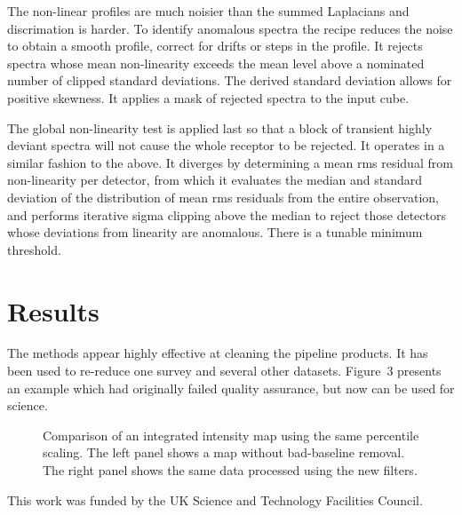 \documentclass[11pt,twoside]{article}
\begin{document}
The non-linear profiles are much noisier than the summed Laplacians
and discrimation is harder.  To identify anomalous spectra the recipe
reduces the noise to obtain a smooth profile, correct for drifts or
steps in the profile.  It rejects spectra whose mean non-linearity
exceeds the mean level above a nominated number of clipped standard
deviations.  The derived standard deviation allows for positive
skewness.  It applies a mask of rejected spectra to the input cube.

The global non-linearity test is applied last so that a block of transient 
highly deviant spectra will not cause the whole receptor to be rejected.  It 
operates in a similar fashion to the above.  It diverges by determining a 
mean rms residual from non-linearity per detector, from which it evaluates 
the median and standard deviation of the distribution of mean rms 
residuals from the entire observation, and performs iterative sigma 
clipping above the median to reject those detectors whose deviations from 
linearity are anomalous.  There is a tunable minimum threshold.

\section{Results}

The methods appear highly effective at cleaning the pipeline products.
It has been used to re-reduce one survey and several other datasets.
Figure~3 presents an example which had originally failed quality assurance,
but now can be used for science.  


\begin{figure}[!ht]
\caption{Comparison of an integrated intensity map using the same
percentile scaling.  The left panel shows a map without bad-baseline
removal.  The right panel shows the same data processed using the
new filters.}
\end{figure}

\acknowledgements This work was funded by the UK Science and Technology Facilities Council.


\end{document}

